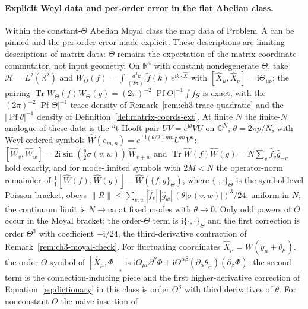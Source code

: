 \paragraph{Explicit Weyl data and per-order error in the flat Abelian class.}
Within the constant-\(\Theta\) Abelian Moyal class the map data of Problem~A can be
pinned and the per-order error made explicit. These descriptions are limiting
descriptions of matrix data: \(\Theta\) remains the expectation of the matrix coordinate
commutator, not input geometry. On \(\mathbb R^4\) with constant nondegenerate
\(\Theta\), take \(\mathcal H=L^2(\mathbb R^2)\) and
\(W_\Theta(f)=\int\frac{d^4k}{(2\pi)^4}\tilde f(k)\,e^{\mathrm i k\cdot\hat X}\) with
\([\hat X_\mu,\hat X_\nu]=\mathrm i\Theta_{\mu\nu}\); the pairing
\(\operatorname{Tr}W_\Theta(f)W_\Theta(g)=(2\pi)^{-2}|\operatorname{Pf}\Theta|^{-1}\!\int fg\)
is exact, with the \((2\pi)^{-2}|\operatorname{Pf}\Theta|^{-1}\) trace density of
Remark~\ref{rem:ch3-trace-quadratic} and the \(|\operatorname{Pf}\theta|^{-1}\) density of
Definition~\ref{def:matrix-coords-ext}. At finite \(N\) the finite-\(N\) analogue of these
data is the ``t Hooft pair \(UV=e^{\mathrm i\theta}VU\) on \(\mathbb C^N\),
\(\theta=2\pi p/N\), with Weyl-ordered symbols
\(\widehat W(e_{m,n})=e^{-\mathrm i(\theta/2)mn}U^mV^n\):
\([\widehat W_v,\widehat W_w]=2\mathrm i\sin(\tfrac{\theta}{2}\sigma(v,w))\,\widehat W_{v+w}\)
and \(\operatorname{Tr}\widehat W(f)\widehat W(g)=N\sum_v\hat f_v\hat g_{-v}\) hold
exactly, and for mode-limited symbols with \(2M<N\) the operator-norm remainder of
\(\tfrac1{\mathrm i}[\widehat W(f),\widehat W(g)]-\widehat W(\{f,g\}_\Theta)\), where
\(\{\cdot,\cdot\}_\Theta\) is the symbol-level Poisson bracket, obeys
\(\|R\|\le\sum_{v,w}|\hat f_v|\,|\hat g_w|\,(\theta|\sigma(v,w)|)^3/24\), uniform in
\(N\); the continuum limit is \(N\to\infty\) at fixed modes with \(\theta\to0\). Only
odd powers of \(\Theta\) occur in the Moyal bracket; the order-\(\Theta\) term is
\(\mathrm i\{\cdot,\cdot\}_\Theta\) and the first correction is order \(\Theta^3\) with
coefficient \(-\mathrm i/24\), the third-derivative contraction of
Remark~\ref{rem:ch3-moyal-check}. For fluctuating coordinates
\(\hat X_\mu=W(y_\mu+\theta_\mu)\), the order-\(\Theta\) symbol of
\([\hat X_\mu,\Phi]_\star\) is
\(\mathrm i\Theta_{\mu\nu}\partial^\nu\Phi+\mathrm i\Theta^{\alpha\beta}(\partial_\alpha\theta_\mu)(\partial_\beta\Phi)\):
the second term is the connection-inducing piece and the first higher-derivative
correction of Equation~\eqref{eq:dictionary} in this class is order \(\Theta^3\) with
third derivatives of \(\theta\). For nonconstant \(\Theta\) the naive insertion of

